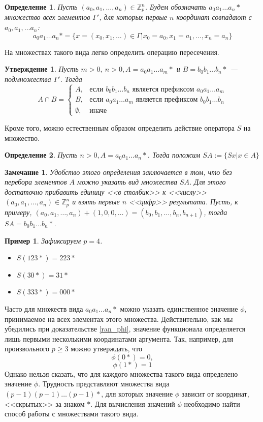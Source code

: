 \documentclass[14pt, a4paper, russian]{report}
\newtheorem{remark}{\indent Замечание}
\newtheorem{definition}{\indent Определение}
\newtheorem{proposition}{\indent Утверждение}
\newtheorem{example}{\indent Пример}
\begin{document}
\begin{definition}
Пусть $(a_0, a_1, \ldots, a_n) \in \mathbb{Z}_p^n$. Будем обозначать $a_0 a_1 \ldots a_n *$ множество всех элементов $\Gamma'$, для которых первые $n$ координат совпадают с $a_0, a_1, \ldots a_n$:
$$ a_0 a_1 \ldots a_n * = \{x = (x_0, x_1, \ldots) \in \Gamma \big| x_0 = a_0, x_1 = a_1, \ldots, x_n = a_n\}$$
\end{definition}
На множествах такого вида легко определить операцию пересечения.
\begin{proposition}\label{intersection}
Пусть $m > 0,\ n > 0, A = a_0 a_1 \ldots a_m *$ и $B = b_0 b_1 \ldots b_n *$ --- подмножества $\Gamma'$. Тогда
$$ A \cap B = \begin{cases}
A, & \text{если } b_0 b_1 \ldots b_n \text{ является префиксом } a_0 a_1 \ldots a_m\\
B, & \text{если } a_0 a_1 \ldots a_m \text{ является префиксом } b_0 b_1 \ldots b_n\\
\emptyset, & \text{иначе}
\end{cases}$$
\end{proposition}
Кроме того, можно естественным образом определить действие оператора $S$ на множество.
\begin{definition}
Пусть $n > 0, A = a_0 a_1 \ldots a_n *$. Тогда положим $SA := \{Sx \big| x \in A\}$
\end{definition}
\begin{remark}\label{SA}
Удобство этого определения заключается в том, что без перебора элементов $A$ можно указать вид множества $SA$. Для этого достаточно прибавить единицу <<в столбик>> к <<числу>> $(a_0, a_1, \ldots, a_n) \in \mathbb{Z}_p^n$ и взять первые $n$ <<цифр>> результата. Пусть, к примеру, $(a_0, a_1, \ldots, a_n) + (1,0,0,\ldots) = (b_0, b_1, \ldots, b_n, b_{n+1})$,  тогда $SA=b_0b_1\ldots b_n*$.
\end{remark}
\begin{example}
Зафиксируем $p=4$. 
\begin{itemize}
\item $S(123*) = 223*$
\item $S(30*) = 31*$
\item $S(333*) = 000*$
\end{itemize}
\end{example}
Часто для множеств вида $ a_0 a_1 \ldots a_n * $ можно указать единственное значение $\phi$, принимаемое на всех элементах этого множества. Действительно, как мы убедились при доказательстве \cref{ran_phi}, значение функционала определяется лишь первыми несколькими координатами аргумента. Так, например, для произвольного $p \ge 3$ можно утверждать, что
$$\phi(0*)=0,$$
$$\phi(1*)=1$$
Однако нельзя сказать, что для каждого множества такого вида определено значение $\phi$. Трудность представляют множества вида $(p-1)(p-1)\ldots(p-1)*$, для которых значение $\phi$ зависит от координат, <<скрытых>> за знаком $*$. Для вычисления значений $\phi$ необходимо найти способ работы с множествами такого вида.
\end{document}
